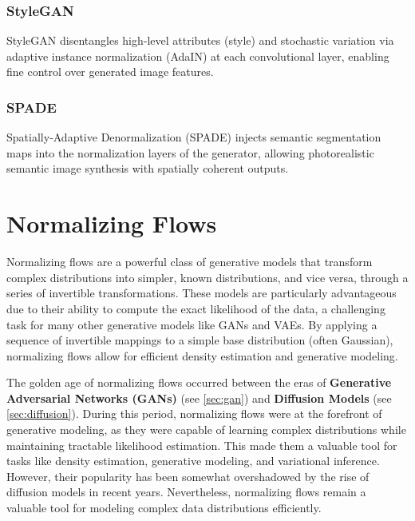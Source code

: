 \documentclass{article}
\begin{document}
\subsubsection{StyleGAN}
StyleGAN disentangles high‑level attributes (style) and stochastic variation via adaptive instance normalization (AdaIN) at each convolutional layer, enabling fine control over generated image features.

\subsubsection{SPADE}
Spatially‑Adaptive Denormalization (SPADE) injects semantic segmentation maps into the normalization layers of the generator, allowing photorealistic semantic image synthesis with spatially coherent outputs.

\clearpage\newpage

\section{Normalizing Flows} \label{sec:flows}

Normalizing flows are a powerful class of generative models that transform complex distributions into simpler, known distributions, and vice versa, through a series of invertible transformations. These models are particularly advantageous due to their ability to compute the exact likelihood of the data, a challenging task for many other generative models like GANs and VAEs. By applying a sequence of invertible mappings to a simple base distribution (often Gaussian), normalizing flows allow for efficient density estimation and generative modeling. 

The golden age of normalizing flows occurred between the eras of \textbf{Generative Adversarial Networks (GANs)} (see \ref{sec:gan}) and \textbf{Diffusion Models} (see \ref{sec:diffusion}). During this period, normalizing flows were at the forefront of generative modeling, as they were capable of learning complex distributions while maintaining tractable likelihood estimation. This made them a valuable tool for tasks like density estimation, generative modeling, and variational inference. However, their popularity has been somewhat overshadowed by the rise of diffusion models in recent years. Nevertheless, normalizing flows remain a valuable tool for modeling complex data distributions efficiently.
\end{document}
